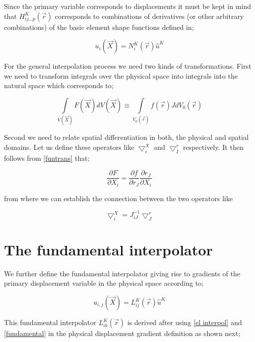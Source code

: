 Since the primary variable corresponds to displacements it must be kept in mind that $H_{ij...p}^K(\vec{r})$ corresponds to combinations of derivatives (or other arbitrary combinations) of the basic element shape functions defined in;


\begin{equation}
u_i(\vec{X})=N_i^K(\vec{r})\hat{u}^K
\label{el interpol}
\end{equation}



For the general interpolation process we need two kinds of transformations.  First we need to transform integrals over the physical space into integrals into the natural space which corresponds to;


\begin{equation}
\int\limits_{V(\vec{X})} F(\vec{X})dV(\vec{X})\equiv \int\limits_{V_0(\vec{r})} f(\vec{r})J dV_0(\vec{r})
\label{gen trans}
\end{equation}



Second we need to relate spatial differentiation in both, the physical and spatial domains.  Let us define these operators like $\bigtriangledown_i^X$ and $\bigtriangledown_I^r$ respectively. It then follows from \cref{funtrans} that;

\begin{equation}
\dfrac{\partial F}{\partial X_i}=\dfrac{\partial f}{\partial r_J}\dfrac{\partial r_J}{\partial X_i}
\label{chain}
\end{equation}

from where we can establish the connection between the two operators like


\begin{equation}
\bigtriangledown_i^X=J_{iJ}^{-1}\bigtriangledown_J^r
\label{fundamental}
\end{equation}


\section*{The fundamental interpolator}
We further define the fundamental interpolator giving rise to gradients of the primary displacement variable in the physical space according to;


\begin{equation}
u_{i,j}(\vec{X})=L_{ij}^K(\vec{r})\hat{u}^K
\label{fund operator}
\end{equation}


This fundamental interpolator  $L_{ik}^K(\vec{r})$ is derived after using \cref{el interpol} and \cref{fundamental} in the physical displacement gradient definition as shown next;


